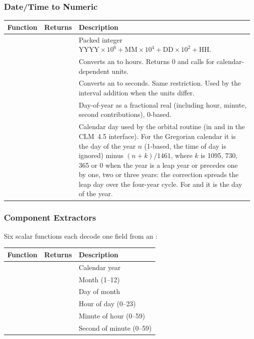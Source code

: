 \subsubsection{Date/Time to Numeric}

\begin{longtable}{L{4cm} L{4cm} L{6cm}}
  \toprule
  \textbf{Function} & \textbf{Returns} & \textbf{Description} \\
  \midrule
  \endhead
  \bottomrule
  \endfoot
   &
     &
    Packed integer $\text{YYYY}\times10^6 + \text{MM}\times10^4
    + \text{DD}\times10^2 + \text{HH}$. \\
   &
     &
    Converts an  to hours. Returns 0 and calls
     for calendar-dependent units. \\
   &
     &
    Converts an  to seconds. Same restriction.
    Used by the interval addition when the units differ. \\
   &
     &
    Day-of-year as a fractional real (including hour, minute, second
    contributions), 0-based. \\
   &
     &
    Calendar day used by the orbital routine  (in
     and in the CLM~4.5 interface). For the Gregorian
    calendar it is the day of the year $n$ (1-based, the time of day is
    ignored) minus $(n + k)/1461$, where $k$ is 1095, 730, 365 or 0 when the
    year is a leap year or precedes one by one, two or three years: the
    correction spreads the leap day over the four-year cycle. For
     and  it is the day of the year. \\
\end{longtable}

\subsubsection{Component Extractors}

Six scalar functions each decode one field from an
:

\begin{longtable}{L{4.5cm} L{4cm} L{5.5cm}}
  \toprule
  \textbf{Function} & \textbf{Returns} & \textbf{Description} \\
  \midrule
  \endhead
  \bottomrule
  \endfoot
     &  & Calendar year \\
    &  & Month (1--12) \\
      &  & Day of month \\
     &  & Hour of day (0--23) \\
   &  & Minute of hour (0--59) \\
   &  & Second of minute (0--59) \\
\end{longtable}

